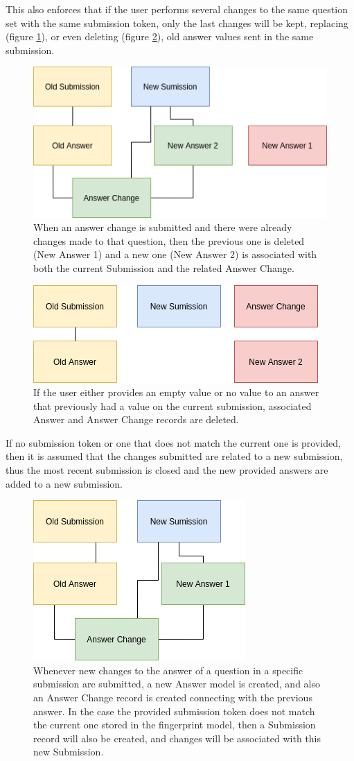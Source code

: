 This also enforces that if the user performs several changes to the same question set with the same submission token, only the last changes will be kept, replacing (figure \ref{fig:submissions-new-answer2}), or even deleting (figure \ref{fig:submissions-remove-answer}), old answer values sent in the same submission.

\begin{figure}[H]
    \center
    \includegraphics[width=.5\textwidth]{submissions-new-answer2}
    \caption{When an answer change is submitted and there were already changes made to that question, then the previous one is deleted (New Answer 1) and a new one (New Answer 2) is associated with both the current Submission and the related Answer Change.}
    \label{fig:submissions-new-answer2}
\end{figure}

\begin{figure}[H]
    \center
    \includegraphics[width=.45\textwidth]{submissions-remove-answer}
    \caption{If the user either provides an empty value or no value to an answer that previously had a value on the current submission, associated Answer and Answer Change records are deleted.}
    \label{fig:submissions-remove-answer}
\end{figure}

If no submission token or one that does not match the current one is provided, then it is assumed that the changes submitted are related to a new submission, thus the most recent submission is closed and the new provided answers are added to a new submission.

\begin{figure}[H]
    \center
    \includegraphics[width=.3\textwidth]{submissions-new-answer}
    \caption{Whenever new changes to the answer of a question in a specific submission are submitted, a new Answer model is created, and also an Answer Change record is created connecting with the previous answer.
In the case the provided submission token does not match the current one stored in the fingerprint model, then a Submission record will also be created, and changes will be associated with this new Submission.}
    \label{fig:submissions-new-answer}
\end{figure}


